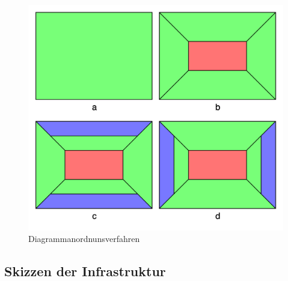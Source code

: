 \begin{figure}
    \label{figure:diagrammanordnungsverfahren}
    \begin{center}
    \includegraphics[scale=0.2]{img/abbildungen/Diagrammanordnunsverfahren}
    \end{center}
    \caption{Diagrammanordnunsverfahren}
\end{figure}

\subsection{Skizzen der Infrastruktur}
\label{subsec:skizzenderinfrastruktur}

